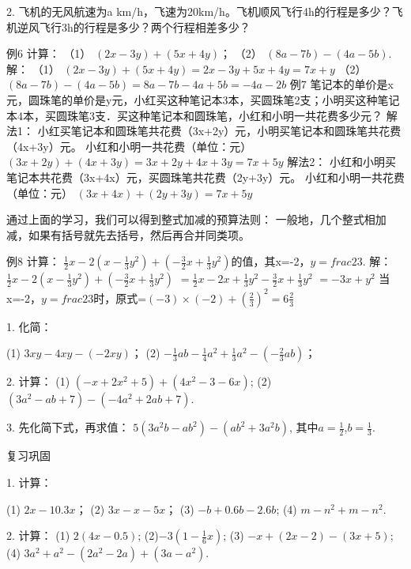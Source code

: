 \documentclass{article}
\begin{document}
\begin{article}
\begin{exercise}
			2. 飞机的无风航速为a km/h，飞速为20km/h。飞机顺风飞行4h的行程是多少？飞机逆风飞行3h的行程是多少？两个行程相差多少？
			
		\end{exercise}
	
		\begin{example}
			例6 计算：
			（1）  $(2x-3y)+(5x+4y)$；  （2）  $(8a-7b)-(4a-5b)$.
			解： （1）  $(2x-3y)+(5x+4y)=2x-3y+5x+4y=7x+y$
			（2）  $(8a-7b)-(4a-5b)=8a-7b-4a+5b=-4a-2b$
			例7  笔记本的单价是x元，圆珠笔的单价是y元，小红买这种笔记本3本，买圆珠笔2支；小明买这种笔记本4本，买圆珠笔3支．买这种笔记本和圆珠笔，小红和小明一共花费多少元？
			解法1： 小红买笔记本和圆珠笔共花费（3x+2y）元，小明买笔记本和圆珠笔共花费（4x+3y）元。
			       小红和小明一共花费（单位：元）
			            $(3x+2y)+(4x+3y)=3x+2y+4x+3y=7x+5y$
			解法2： 小红和小明买笔记本共花费（3x+4x）元，买圆珠笔共花费（2y+3y）元。
			        小红和小明一共花费（单位：元）
			            $(3x+4x)+(2y+3y)=7x+5y$
		\end{example}
		 通过上面的学习，我们可以得到整式加减的预算法则：
		 一般地，几个整式相加减，如果有括号就先去括号，然后再合并同类项。
		\begin{example}
			例8 计算： $\frac{1}{2}x-2(x-\frac{1}{3}y^2)+(-\frac{3}{2}x+\frac{1}{3}y^2)$的值，其x=-2，$y=frac{2}{3}$.
			解：   $\frac{1}{2}x-2(x-\frac{1}{3}y^2)+(-\frac{3}{2}x+\frac{1}{3}y^2)$
			     $=\frac{1}{2}x-2x+\frac{1}{3}y^2-\frac{3}{2}x+\frac{1}{3}y^2$
			     $=-3x+y^2$
			当x=-2，$y=frac{2}{3}$时，原式=$(-3)\times(-2)+{(\frac{2}{3})}^2=6\frac{2}{3}$
		\end{example}
	    \begin{exercise}
	    	1. 化简：
	    	
	    	(1) $3xy-4xy-(-2xy)$；     (2) $-\frac{1}{3}ab-\frac{1}{4}a^2+\frac{1}{3}a^2-(-\frac{2}{3}ab)$；
	    	
	    	2. 计算：
	    	(1) $(-x+2x^2+5)+(4x^2-3-6x)$;   (2)$(3a^2-ab+7)-(-4a^2+2ab+7)$.
	    	
	    	3. 先化简下式，再求值：
	    	                $5(3a^2b-ab^2)-(ab^2+3a^2b)$,
	    	   其中$a=\frac{1}{2}$,$b=\frac{1}{3}$.
	    	
	    \end{exercise}
         复习巩固
         \begin{exercise}
         	1. 计算：
         	
         	(1) $2x-10.3x$；     (2) $3x-x-5x$；
         	(3) $-b+0.6b-2.6b$;  (4) $m-n^2+m-n^2$.
         	
         	2. 计算：
         	(1) $2(4x-0.5)$;           (2)$-3(1-\frac{1}{6}x)$;
         	(3) $-x+(2x-2)-(3x+5)$;    (4) $3a^2+a^2-(2a^2-2a)+(3a-a^2)$.
         	

\end{exercise}
\end{article}
\end{document}
